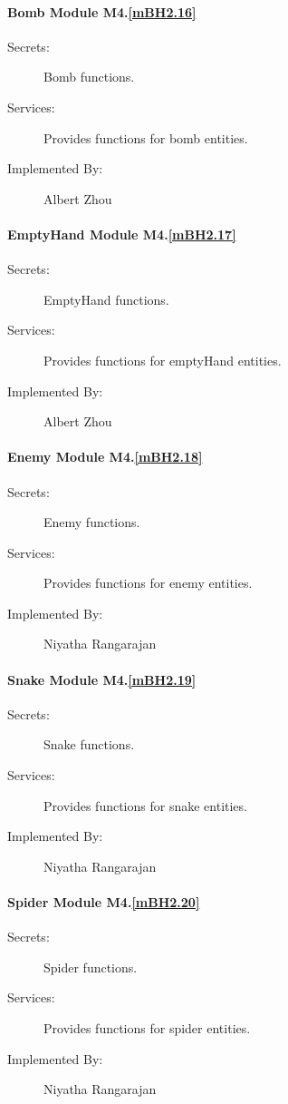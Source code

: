 \documentclass[12pt, titlepage]{article}
\begin{document}
{\paragraph{Bomb Module M4.\ref{mBH2.16}}
\begin{description}
\item[Secrets:] Bomb functions.
\item[Services:] Provides functions for bomb entities. 
\item[Implemented By:] Albert Zhou
\end{description}

\paragraph{EmptyHand Module M4.\ref{mBH2.17}}
\begin{description}
\item[Secrets:] EmptyHand functions.
\item[Services:] Provides functions for emptyHand entities. 
\item[Implemented By:] Albert Zhou
\end{description}

\paragraph{Enemy Module M4.\ref{mBH2.18}}
\begin{description}
\item[Secrets:] Enemy functions.
\item[Services:] Provides functions for enemy entities. 
\item[Implemented By:] Niyatha Rangarajan
\end{description}

\paragraph{Snake Module M4.\ref{mBH2.19}}
\begin{description}
\item[Secrets:] Snake functions.
\item[Services:] Provides functions for snake entities. 
\item[Implemented By:] Niyatha Rangarajan
\end{description}

\paragraph{Spider Module M4.\ref{mBH2.20}}
\begin{description}
\item[Secrets:] Spider functions.
\item[Services:] Provides functions for spider entities. 
\item[Implemented By:] Niyatha Rangarajan
\end{description}

}
\end{document}
